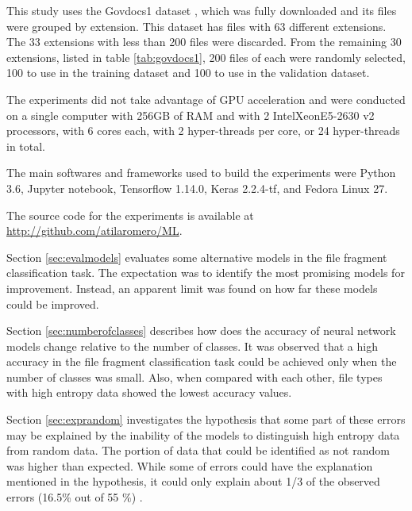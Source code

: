 This study uses the Govdocs1 dataset \cite{garfinkel_bringing_2009}, which was fully downloaded and its files were grouped by extension. This dataset has files with 63 different extensions. The 33 extensions with less than 200 files were discarded. From the remaining 30 extensions, listed in table \ref{tab:govdocs1}, 200 files of each were randomly selected, 100 to use in the training dataset and 100 to use in the validation dataset.



The experiments did not take advantage of GPU acceleration and were  conducted on a single computer with 256GB of RAM and with 2 Intel\textregistered Xeon\textregistered E5-2630 v2 processors, with 6 cores each, with 2 hyper-threads per core, or 24 hyper-threads in total. 


The main softwares and frameworks used to build the experiments were Python 3.6, Jupyter notebook, Tensorflow 1.14.0, Keras 2.2.4-tf, and Fedora Linux 27.

The source code for the experiments is available at \url{http://github.com/atilaromero/ML}.

Section \ref{sec:evalmodels} evaluates some alternative models in the file fragment classification task. The expectation was to identify the most promising models for improvement. Instead, an apparent limit was found on how far these models could be improved. 

Section \ref{sec:numberofclasses} describes how does the accuracy of neural network models change relative to the number of classes. It was observed that a high accuracy in the file fragment classification task could be achieved only when the number of classes was small. Also, when compared with each other, file types with high entropy data showed the lowest accuracy values.

Section \ref{sec:exprandom} investigates the hypothesis that some part of these errors may be explained by the inability of the models to distinguish high entropy data from random data. The portion of data that could be identified as not random was higher than expected. While some of errors could have the explanation mentioned in the hypothesis, it could only explain about 1/3 of the observed errors (16.5\% out of 55
\%) .







